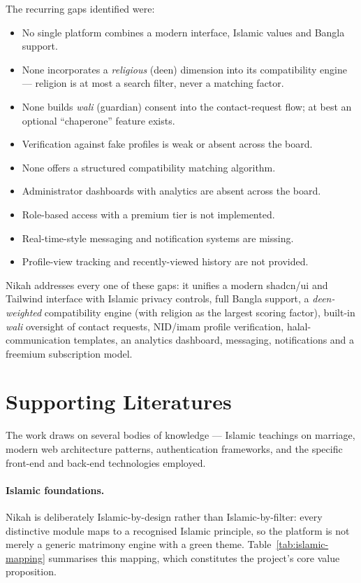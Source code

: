 \documentclass[12pt,a4paper]{report}
\begin{document}
The recurring gaps identified were:
\begin{itemize}
  \item No single platform combines a modern interface, Islamic values and
        Bangla support.
  \item None incorporates a \emph{religious} (deen) dimension into its
        compatibility engine --- religion is at most a search filter, never a
        matching factor.
  \item None builds \emph{wali} (guardian) consent into the contact-request
        flow; at best an optional ``chaperone'' feature exists.
  \item Verification against fake profiles is weak or absent across the board.
  \item None offers a structured compatibility matching algorithm.
  \item Administrator dashboards with analytics are absent across the board.
  \item Role-based access with a premium tier is not implemented.
  \item Real-time-style messaging and notification systems are missing.
  \item Profile-view tracking and recently-viewed history are not provided.
\end{itemize}

Nikah addresses every one of these gaps: it unifies a modern shadcn/ui and
Tailwind interface with Islamic privacy controls, full Bangla support, a
\emph{deen-weighted} compatibility engine (with religion as the largest scoring
factor), built-in \emph{wali} oversight of contact requests, NID/imam profile
verification, halal-communication templates, an analytics dashboard, messaging,
notifications and a freemium subscription model.

\section{Supporting Literatures}
The work draws on several bodies of knowledge --- Islamic teachings on marriage,
modern web architecture patterns, authentication frameworks, and the specific
front-end and back-end technologies employed.

\paragraph{Islamic foundations.} Nikah is deliberately Islamic-by-design rather
than Islamic-by-filter: every distinctive module maps to a recognised Islamic
principle, so the platform is not merely a generic matrimony engine with a
green theme. Table~\ref{tab:islamic-mapping} summarises this mapping, which
constitutes the project's core value proposition.
\end{document}
